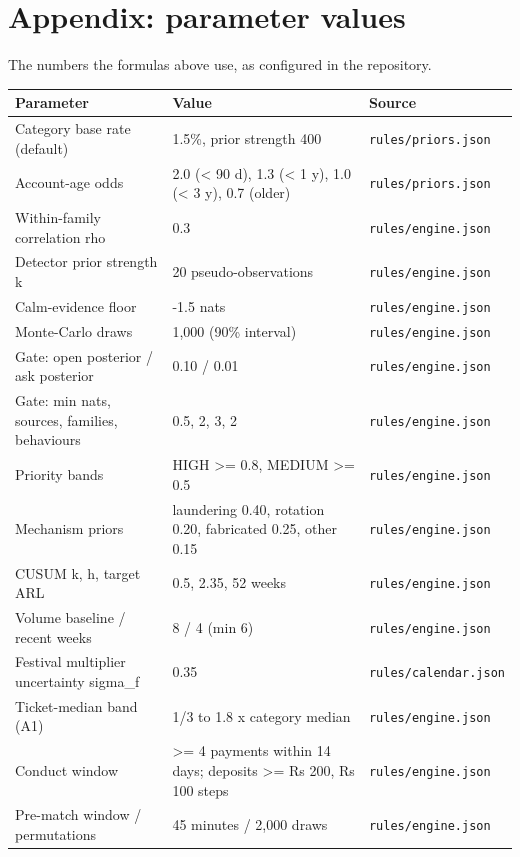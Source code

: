 \documentclass[11pt,a4paper]{article}
\begin{document}
\section{Appendix: parameter values}
{\color{mute}The numbers the formulas above use, as configured in the repository.}

{\small\begin{longtable}{@{}p{52mm}p{78mm}p{36mm}@{}}\toprule
\textbf{Parameter} & \textbf{Value} & \textbf{Source}\\\midrule\endhead
Category base rate (default) & 1.5\%, prior strength 400 & \texttt{rules/priors.json}\\
Account-age odds & 2.0 (\textless{} 90 d), 1.3 (\textless{} 1 y), 1.0 (\textless{} 3 y), 0.7 (older) & \texttt{rules/priors.json}\\
Within-family correlation rho & 0.3 & \texttt{rules/engine.json}\\
Detector prior strength k & 20 pseudo-observations & \texttt{rules/engine.json}\\
Calm-evidence floor & -1.5 nats & \texttt{rules/engine.json}\\
Monte-Carlo draws & 1,000 (90\% interval) & \texttt{rules/engine.json}\\
Gate: open posterior / ask posterior & 0.10 / 0.01 & \texttt{rules/engine.json}\\
Gate: min nats, sources, families, behaviours & 0.5, 2, 3, 2 & \texttt{rules/engine.json}\\
Priority bands & HIGH \textgreater{}= 0.8, MEDIUM \textgreater{}= 0.5 & \texttt{rules/engine.json}\\
Mechanism priors & laundering 0.40, rotation 0.20, fabricated 0.25, other 0.15 & \texttt{rules/engine.json}\\
CUSUM k, h, target ARL & 0.5, 2.35, 52 weeks & \texttt{rules/engine.json}\\
Volume baseline / recent weeks & 8 / 4 (min 6) & \texttt{rules/engine.json}\\
Festival multiplier uncertainty sigma\_f & 0.35 & \texttt{rules/calendar.json}\\
Ticket-median band (A1) & 1/3 to 1.8 x category median & \texttt{rules/engine.json}\\
Conduct window & \textgreater{}= 4 payments within 14 days; deposits \textgreater{}= Rs 200, Rs 100 steps & \texttt{rules/engine.json}\\
Pre-match window / permutations & 45 minutes / 2,000 draws & \texttt{rules/engine.json}\\

\end{longtable}}
\end{document}
